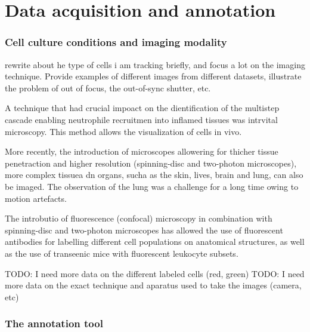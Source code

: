 \chapter{Data acquisition and annotation }
	\label{chap:data}


    \subsection{Cell culture conditions and imaging modality }
    
    rewrite about he type of cells i am tracking briefly, and focus a lot on the imaging technique. Provide examples of different images from different datasets,
    illustrate the problem of out of focus, the out-of-sync shutter, etc.
    
    
    A technique that had crucial impoact on the dientification of the multistep cascade enabling neutrophile recruitmen into inflamed tissues was intrvital microscopy. This method allows the visualization of cells in vivo.
    
    More recently, the introduction of microscopes allowering for thicher tissue penetraction and higher resolution (spinning-disc and two-photon microscopes), more complex tissuea dn organs, sucha as the skin, lives, brain and lung, can also be imaged. The observation of the lung was a challenge for a long time owing to motion artefacts. 
    
    The introbutio of fluorescence (confocal) microscopy  in combination with spinning-disc and two-photon microscopes  has allowed the use of fluorescent antibodies for labelling different cell populations on anatomical structures, as well as the use of transeenic mice with fluorescent leukocyte subsets. 
    
    TODO: I need more data on the different labeled cells (red, green)
    TODO: I need more data on the exact technique and aparatus used to take the images (camera, etc)
    
    \subsection{The annotation tool \statusnew}
    
    
    	
